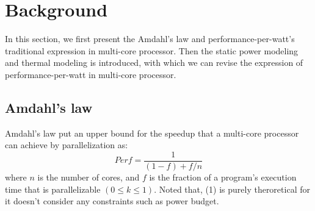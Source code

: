 \section{Background}
In this section, we first present the Amdahl's law and performance-per-watt's traditional expression in multi-core processor. Then the static power modeling and thermal modeling is introduced, with which we can revise the expression of performance-per-watt in multi-core processor.











\subsection{Amdahl's law}
Amdahl's law put an upper bound for the speedup that a multi-core processor can achieve by parallelization as:
\begin{equation}\label{speedup}
Perf = \frac{1} {(1-f)+f/n}
\end{equation}
where $n$ is the number of cores, and $f$ is the fraction of a program's execution time that is parallelizable $(0 \le k \le 1)$. Noted that, (1) is purely theroretical for it doesn't consider any constraints such as power budget.

